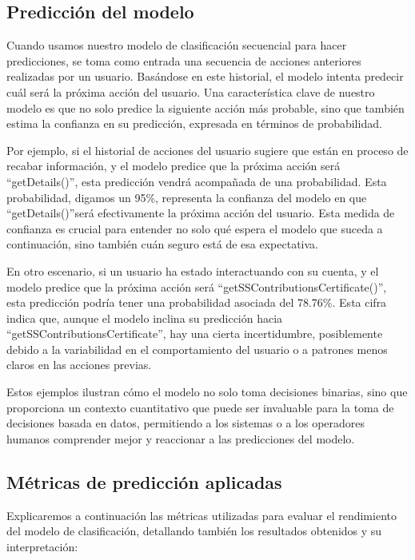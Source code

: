 \subsection{Predicción del modelo}

Cuando usamos nuestro modelo de clasificación secuencial para hacer predicciones, se toma como entrada una secuencia de acciones anteriores realizadas por un usuario. Basándose en este historial, el modelo intenta predecir cuál será la próxima acción del usuario. Una característica clave de nuestro modelo es que no solo predice la siguiente acción más probable, sino que también estima la confianza en su predicción, expresada en términos de probabilidad.

Por ejemplo, si el historial de acciones del usuario sugiere que están en proceso de recabar información, y el modelo predice que la próxima acción será \textquotedblleft getDetails()\textquotedblright, esta predicción vendrá acompañada de una probabilidad. Esta probabilidad, digamos un 95\%, representa la confianza del modelo en que \textquotedblleft getDetails()\textquotedblright será efectivamente la próxima acción del usuario. Esta medida de confianza es crucial para entender no solo qué espera el modelo que suceda a continuación, sino también cuán seguro está de esa expectativa.

En otro escenario, si un usuario ha estado interactuando con su cuenta, y el modelo predice que la próxima acción será \textquotedblleft getSSContributionsCertificate()\textquotedblright, esta predicción podría tener una probabilidad asociada del 78.76\%. Esta cifra indica que, aunque el modelo inclina su predicción hacia \textquotedblleft getSSContributionsCertificate\textquotedblright, hay una cierta incertidumbre, posiblemente debido a la variabilidad en el comportamiento del usuario o a patrones menos claros en las acciones previas.

Estos ejemplos ilustran cómo el modelo no solo toma decisiones binarias, sino que proporciona un contexto cuantitativo que puede ser invaluable para la toma de decisiones basada en datos, permitiendo a los sistemas o a los operadores humanos comprender mejor y reaccionar a las predicciones del modelo.

\subsection{Métricas de predicción aplicadas}

Explicaremos a continuación las métricas utilizadas para evaluar el rendimiento del modelo de clasificación, detallando también los resultados obtenidos y su interpretación:

